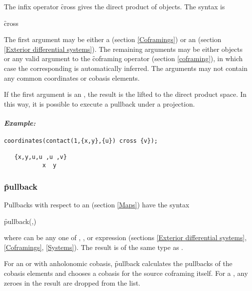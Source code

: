 \hypertarget{operator:EDS_CROSS}{}
The infix operator \f{cross} gives the direct product of
 objects. The syntax is
\begin{syntax}
	 \f{cross}  
\end{syntax}
The first argument may be either a  (section
\ref{Coframings}) or an  (section \ref{Exterior differential
systems}). The remaining arguments may be either 
objects or any valid argument to the \f{coframing} operator (section
\ref{coframing}), in which case the corresponding  is
automatically inferred. The arguments may not contain any common
coordinates or cobasis elements.

If the first argument is an , the result is the 
lifted to the direct product space. In this way, it is possible to
execute a pullback under a projection.

\paragraph{\textit{Example:}}
\begin{verbatim}
coordinates(contact(1,{x,y},{u}) cross {v});

   {x,y,u,u ,u ,v}
           x  y
\end{verbatim}

\subsubsection{\f{pullback}}
\label{pullback}

\hypertarget{operator:PULLBACK}{}
Pullbacks with respect to an   (section \ref{Maps}) have the
syntax
\begin{syntax}
	\f{pullback}(,)
\end{syntax}
where  can be any one of , ,
 or  expression (sections \ref{Exterior
differential systems}, \ref{Coframings}, \ref{Systems}). The result is of
the same type as .

For an  or  with anholonomic cobasis, \f{pullback}
calculates the pullbacks of the cobasis elements and chooses a cobasis for
the source coframing itself. For a , any zeroes in the result
are dropped from the list.

